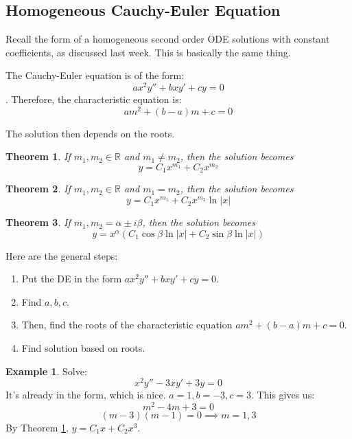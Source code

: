 \documentclass{article}
\newtheorem{thm}{Theorem}
\theoremstyle{definition}
\newtheorem{example}{Example}[section]
\begin{document}
\subsection{Homogeneous Cauchy-Euler Equation}

Recall the form of a homogeneous second order ODE solutions with constant coefficients, as discussed last week. This is basically the same thing. 

The Cauchy-Euler equation is of the form:
\[ ax^2y'' + bxy' + cy = 0 \]. Therefore, the characteristic equation is:
\[am^2 + (b-a)m + c = 0 \]

The solution then depends on the roots. 
\begin{thm} \label{real distinct cauchyeuler}
    If $m_1, m_2 \in \mathbb{R}$ and $m_1 \neq m_2$, then the solution becomes 
    \[ 
    y = C_1x^{m_1}+C_2x^{m_2}
    \]
    \end{thm}
    
\begin{thm} \label{real repeated cauchyeuler}
    If $m_1, m_2 \in \mathbb{R}$ and $m_1 = m_2$, then the solution becomes 
        \[ 
            y = C_1x^{m_1}+C_2x^{m_2}\ln{\vert x \vert}
        \]
\end{thm}
    
\begin{thm} \label{complex cauchyeuler}
        If $m_1, m_2 = \alpha \pm i\beta$, then the solution becomes 
            \[ 
            y = x^{\alpha}(C_1\cos{\beta \ln{\vert x \vert}} + C_2\sin{\beta \ln{\vert x \vert}})
            \]
\end{thm}
Here are the general steps: 
\begin{enumerate}
    \item Put the DE in the form $ax^2y'' + bxy' + cy = 0$.
    \item Find $a, b, c$.
    \item Then, find the roots of the characteristic equation $am^2 + (b-a)m + c = 0$.
    \item Find solution based on roots. 
\end{enumerate}

\begin{example}
    Solve: \[x^2y''-3xy' + 3y = 0\]
    It's already in the form, which is nice. $a = 1, b = -3, c = 3$.
    This gives us: \[m^2 - 4m + 3 = 0\]
    \[(m-3)(m-1)= 0 \implies m = 1, 3\]
    By Theorem \ref{real distinct cauchyeuler}, $y = C_1x+C_2x^{3}$.
\end{example}
\end{document}
